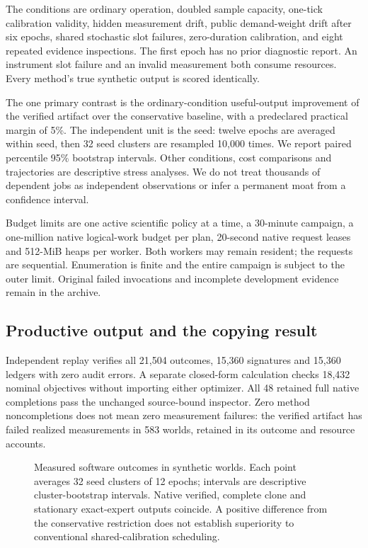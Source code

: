 The conditions are ordinary operation, doubled sample capacity, one-tick calibration validity, hidden measurement drift, public demand-weight drift after six epochs, shared stochastic slot failures, zero-duration calibration, and eight repeated evidence inspections. The first epoch has no prior diagnostic report. An instrument slot failure and an invalid measurement both consume resources. Every method's true synthetic output is scored identically.

The one primary contrast is the ordinary-condition useful-output improvement of the verified artifact over the conservative baseline, with a predeclared practical margin of 5\%. The independent unit is the seed: twelve epochs are averaged within seed, then 32 seed clusters are resampled 10,000 times. We report paired percentile 95\% bootstrap intervals. Other conditions, cost comparisons and trajectories are descriptive stress analyses. We do not treat thousands of dependent jobs as independent observations or infer a permanent moat from a confidence interval.

Budget limits are one active scientific policy at a time, a 30-minute campaign, a one-million native logical-work budget per plan, 20-second native request leases and 512-MiB heaps per worker. Both workers may remain resident; the requests are sequential. Enumeration is finite and the entire campaign is subject to the outer limit. Original failed invocations and incomplete development evidence remain in the archive.

\subsection{Productive output and the copying result}
\MainResults

Independent replay verifies all 21,504 outcomes, 15,360 signatures and 15,360 ledgers with zero audit errors. A separate closed-form calculation checks 18,432 nominal objectives without importing either optimizer. All 48 retained full native completions pass the unchanged source-bound inspector. Zero method noncompletions does not mean zero measurement failures: the verified artifact has failed realized measurements in 583 worlds, retained in its outcome and resource accounts.
\ResultsTable

\begin{figure}[H]\centering
\resizebox{\textwidth}{!}{}
\caption{Measured software outcomes in synthetic worlds. Each point averages 32 seed clusters of 12 epochs; intervals are descriptive cluster-bootstrap intervals. Native verified, complete clone and stationary exact-expert outputs coincide. A positive difference from the conservative restriction does not establish superiority to conventional shared-calibration scheduling.}
\end{figure}

